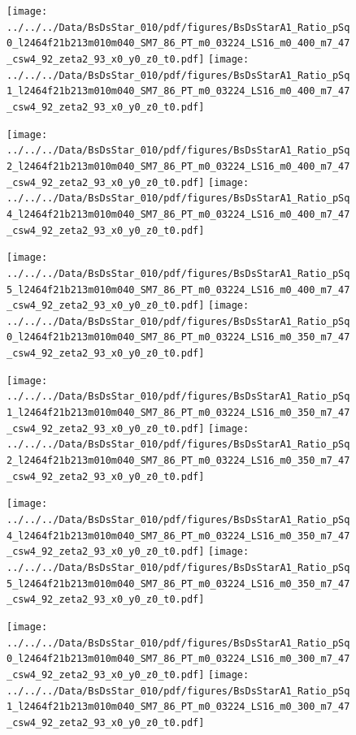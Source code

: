 \documentclass[a4paper,10pt]{article}
\begin{document}
\begin{figure}[p]
 \texttt{[image: ../../../Data/BsDsStar\_010/pdf/figures/BsDsStarA1\_Ratio\_pSq0\_l2464f21b213m010m040\_SM7\_86\_PT\_m0\_03224\_LS16\_m0\_400\_m7\_47\_csw4\_92\_zeta2\_93\_x0\_y0\_z0\_t0.pdf]} 
 \texttt{[image: ../../../Data/BsDsStar\_010/pdf/figures/BsDsStarA1\_Ratio\_pSq1\_l2464f21b213m010m040\_SM7\_86\_PT\_m0\_03224\_LS16\_m0\_400\_m7\_47\_csw4\_92\_zeta2\_93\_x0\_y0\_z0\_t0.pdf]} 
 \end{figure}
\begin{figure}[p]
 \texttt{[image: ../../../Data/BsDsStar\_010/pdf/figures/BsDsStarA1\_Ratio\_pSq2\_l2464f21b213m010m040\_SM7\_86\_PT\_m0\_03224\_LS16\_m0\_400\_m7\_47\_csw4\_92\_zeta2\_93\_x0\_y0\_z0\_t0.pdf]} 
 \texttt{[image: ../../../Data/BsDsStar\_010/pdf/figures/BsDsStarA1\_Ratio\_pSq4\_l2464f21b213m010m040\_SM7\_86\_PT\_m0\_03224\_LS16\_m0\_400\_m7\_47\_csw4\_92\_zeta2\_93\_x0\_y0\_z0\_t0.pdf]} 
 \end{figure}
\begin{figure}[p]
 \texttt{[image: ../../../Data/BsDsStar\_010/pdf/figures/BsDsStarA1\_Ratio\_pSq5\_l2464f21b213m010m040\_SM7\_86\_PT\_m0\_03224\_LS16\_m0\_400\_m7\_47\_csw4\_92\_zeta2\_93\_x0\_y0\_z0\_t0.pdf]} 
 \texttt{[image: ../../../Data/BsDsStar\_010/pdf/figures/BsDsStarA1\_Ratio\_pSq0\_l2464f21b213m010m040\_SM7\_86\_PT\_m0\_03224\_LS16\_m0\_350\_m7\_47\_csw4\_92\_zeta2\_93\_x0\_y0\_z0\_t0.pdf]} 
 \end{figure}
\clearpage
\begin{figure}[p]
 \texttt{[image: ../../../Data/BsDsStar\_010/pdf/figures/BsDsStarA1\_Ratio\_pSq1\_l2464f21b213m010m040\_SM7\_86\_PT\_m0\_03224\_LS16\_m0\_350\_m7\_47\_csw4\_92\_zeta2\_93\_x0\_y0\_z0\_t0.pdf]} 
 \texttt{[image: ../../../Data/BsDsStar\_010/pdf/figures/BsDsStarA1\_Ratio\_pSq2\_l2464f21b213m010m040\_SM7\_86\_PT\_m0\_03224\_LS16\_m0\_350\_m7\_47\_csw4\_92\_zeta2\_93\_x0\_y0\_z0\_t0.pdf]} 
 \end{figure}
\begin{figure}[p]
 \texttt{[image: ../../../Data/BsDsStar\_010/pdf/figures/BsDsStarA1\_Ratio\_pSq4\_l2464f21b213m010m040\_SM7\_86\_PT\_m0\_03224\_LS16\_m0\_350\_m7\_47\_csw4\_92\_zeta2\_93\_x0\_y0\_z0\_t0.pdf]} 
 \texttt{[image: ../../../Data/BsDsStar\_010/pdf/figures/BsDsStarA1\_Ratio\_pSq5\_l2464f21b213m010m040\_SM7\_86\_PT\_m0\_03224\_LS16\_m0\_350\_m7\_47\_csw4\_92\_zeta2\_93\_x0\_y0\_z0\_t0.pdf]} 
 \end{figure}
\begin{figure}[p]
 \texttt{[image: ../../../Data/BsDsStar\_010/pdf/figures/BsDsStarA1\_Ratio\_pSq0\_l2464f21b213m010m040\_SM7\_86\_PT\_m0\_03224\_LS16\_m0\_300\_m7\_47\_csw4\_92\_zeta2\_93\_x0\_y0\_z0\_t0.pdf]} 
 \texttt{[image: ../../../Data/BsDsStar\_010/pdf/figures/BsDsStarA1\_Ratio\_pSq1\_l2464f21b213m010m040\_SM7\_86\_PT\_m0\_03224\_LS16\_m0\_300\_m7\_47\_csw4\_92\_zeta2\_93\_x0\_y0\_z0\_t0.pdf]} 
 \end{figure}
\end{document}
